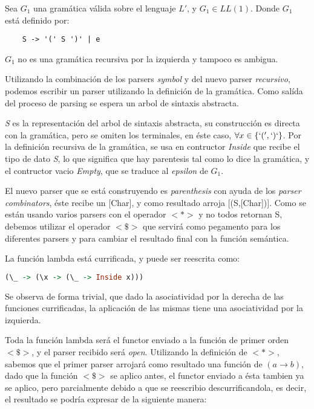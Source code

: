 \begin{exmp}
	Sea $G_1$ una gramática válida sobre el lenguaje $L'$, y $G_1 \in LL(1)$.
	Donde $G_1$ está definido por:

	\begin{lstlisting}
	S -> '(' S ')' | e
	\end{lstlisting}
		
	$G_1$ no es una gramática recursiva por la izquierda y tampoco es ambigua.
	
	Utilizando la combinación de los parsers \emph{symbol} y del nuevo parser \emph{recursivo}, podemos escribir un parser utilizando la definición de la gramática. Como salída del proceso de parsing se espera un arbol de sintaxis abstracta.
	
	
	
	\emph{S} es la representación del arbol de sintaxis abstracta, su construcción es directa con la gramática, pero se omiten los terminales, en éste caso, $\forall x \in \{ `(', `)` \}$. Por la definición recursiva de la gramática, se usa en contructor \emph{Inside} que recibe el tipo de dato \emph{S}, lo que significa que hay parentesis tal como lo dice la gramática, y el contructor vacio \emph{Empty}, que se traduce al \emph{epsilon} de $G_1$.
	
	El nuevo parser que se está construyendo es \emph{parenthesis} con ayuda de los \emph{parser combinators}, éste recibe un [Char], y como resultado arroja [(S,[Char])]. Como se están usando varios parsers con el operador $<*>$ y no todos retornan S, debemos utilizar el operador $<\$>$ que servirá como pegamento para los diferentes parsers y para cambiar el resultado final con la función semántica.
	
	La función lambda está currificada, y puede ser reescrita como:
	
	\begin{lstlisting}[language=Haskell]
		(\_ -> (\x -> (\_ -> Inside x)))
	\end{lstlisting}

	Se observa de forma trivial, que dado la asociatividad por la derecha de las funciones currificadas, la aplicación de las mismas tiene una asociatividad por la izquierda.
	
	Toda la función lambda será el functor enviado a la función de primer orden $<\$>$, y el parser recibido será \emph{open}. Utilizando la definición de $<*>$, sabemos que el primer parser arrojará como resultado una función de $(a \to b)$, dado que la función $<\$>$ se aplico antes, el functor enviado a ésta tambien ya se aplico, pero parcialmente debido a que se reescribio descurrificandola, es decir, el resultado se podría expresar de la siguiente manera:
	

\end{exmp}
